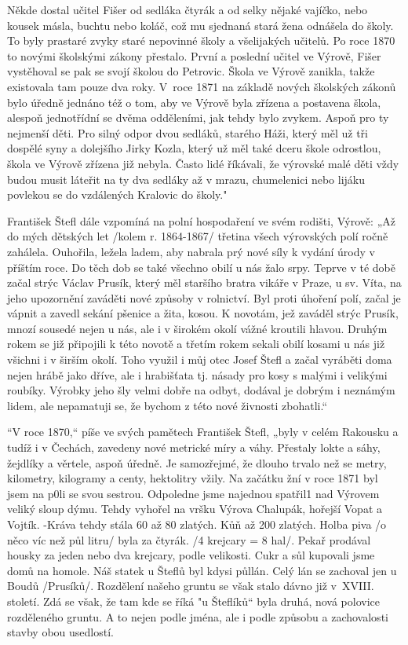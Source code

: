 \documentclass[../dejiny-rodu-prusiku.tex]{subfiles}
\begin{document}
Někde dostal učitel Fišer od sedláka čtyrák a od selky nějaké vajíčko, nebo kousek másla, buchtu nebo koláč, což mu sjednaná stará žena odnášela do školy. To byly prastaré zvyky staré nepovinné školy a všelijakých učitelů. Po roce 1870 to novými školskými zákony přestalo. První a poslední učitel ve Výrově, Fišer vystěhoval se pak se svojí školou do Petrovic. Škola ve Výrově zanikla, takže existovala tam pouze dva roky. V roce 1871 na základě nových školských zákonů bylo úředně jednáno též o tom, aby ve Výrově byla zřízena a postavena škola, alespoň jednotřídní se dvěma odděleními, jak tehdy bylo zvykem. Aspoň pro ty nejmenší děti. Pro silný odpor dvou sedláků, starého Háži, který měl už tři dospělé syny a dolejšího Jirky Kozla, který už měl také dce­ru škole odrostlou, škola ve Výrově zřízena již nebyla. Často lidé říkávali, že výrovské malé děti vždy budou musit láteřit na ty dva sedláky až v mrazu, chumelenici nebo lijáku povlekou se do vzdálených Kralovic do školy."

František Štefl dále vzpomíná na polní hospodaření ve svém rodišti, Výrově: „Až do mých dětských let /kolem r. 1864-1867/ třetina všech výrovských polí ročně zahálela. Ouhořila, ležela ladem, aby nabrala prý nové síly k vydání úrody v příštím roce. Do těch dob se také všechno obilí u nás žalo srpy. Teprve v té době začal strýc Václav Prusík, který měl staršího bratra vikáře v Praze, u sv. Víta, na jeho upozornění zaváděti nové způsoby v rolnictví. Byl proti úhoření polí, začal je vápnit a za­vedl sekání pšenice a žita, kosou. K novotám, jež zavá­děl strýc Prusík, mnozí sousedé nejen u nás, ale i v širokém okolí vážné kroutili hlavou. Druhým rokem se již připojili k této novotě a třetím rokem sekali obilí kosami u nás již všichni i v širším okolí. Toho využil i můj otec Josef Štefl a začal vyráběti doma nejen hrábě jako dříve, ale i hrabišťata tj. násady pro kosy s malý­mi i velikými roubíky. Výrobky jeho šly velmi dobře na odbyt, dodával je dobrým i neznámým lidem, ale nepamatuji se, že bychom z této nové živnosti zbohatli.“

“V roce 1870,“ píše ve svých pamětech František Štefl, „byly v celém Rakousku a tudíž i v Čechách, zavedeny nové metrické míry a váhy. Přestaly lokte a sáhy, žejdlíky a věrtele, aspoň úředně. Je samozřejmé, že dlouho trvalo než se metry, kilometry, kilogramy a centy, hektolitry vžily. Na začátku žní v roce 1871 byl jsem na p0li se svou sestrou. Odpoledne jsme najednou spatřil1 nad Výrovem veliký sloup dýmu. Tehdy vyhořel na vršku Výrova Chalupák, hořejší Vopat a Vojtík. -Kráva tehdy stála 60 až 80 zlatých. Kůň až 200 zlatých. Holba piva /o něco víc než půl litru/ byla za čtyrák. /4 krejcary = 8 hal/. Pekař prodával housky za jeden nebo dva krejcary, podle velikosti. Cukr a sůl kupovali jsme domů na homole. Náš statek u Šteflů byl kdysi půllán. Celý lán se zachoval jen u Boudů /Prusíků/. Rozdělení našeho gruntu se však stalo dávno již v XVIII. století. Zdá se však, že tam kde se říká "u Šteflíků“ byla druhá, nová polovice rozděleného gruntu. A to nejen podle jména, ale i podle způsobu a zachovalosti stavby obou usedlostí.
\end{document}
